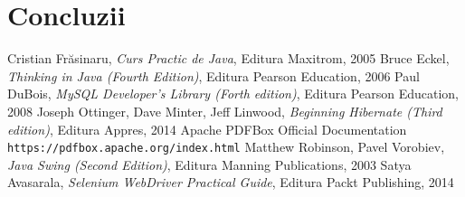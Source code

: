 \documentclass[12pt]{book}
\begin{document}
\chapter{Concluzii}

\begin{thebibliography}{9}
	  Cristian Frăsinaru, {\em Curs Practic de Java}, Editura Maxitrom, 2005
	  Bruce Eckel, {\em Thinking in Java (Fourth Edition)}, Editura Pearson Education, 2006
	 Paul DuBois, {\em MySQL Developer's Library (Forth edition)}, Editura Pearson Education, 2008
	 Joseph Ottinger, Dave Minter, Jeff Linwood, {\em Beginning Hibernate (Third edition)}, Editura Appres, 2014
	 Apache PDFBox Official Documentation
	\\\texttt{https://pdfbox.apache.org/index.html}
	 Matthew Robinson, Pavel Vorobiev, {\em Java Swing (Second Edition)}, Editura Manning Publications, 2003
	 Satya Avasarala, {\em Selenium WebDriver Practical Guide}, Editura Packt Publishing, 2014
\end{thebibliography}
	
\end{document}
